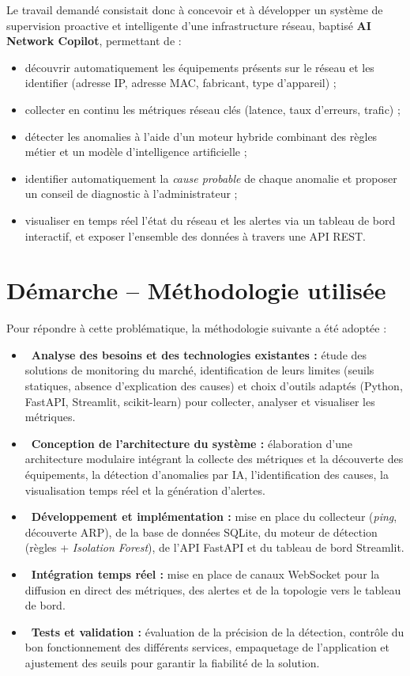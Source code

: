 \documentclass[12pt,a4paper]{report}
\newcommand{\diamonditem}{\ding{117}}   %
\begin{document}
Le travail demandé consistait donc à concevoir et à développer un système de
supervision proactive et intelligente d'une infrastructure réseau, baptisé
\textbf{AI Network Copilot}, permettant de :
\begin{itemize}[leftmargin=*]
\item découvrir automatiquement les équipements présents sur le réseau et les
identifier (adresse IP, adresse MAC, fabricant, type d'appareil) ;
\item collecter en continu les métriques réseau clés (latence, taux d'erreurs,
trafic) ;
\item détecter les anomalies à l'aide d'un moteur hybride combinant des règles
métier et un modèle d'intelligence artificielle ;
\item identifier automatiquement la \emph{cause probable} de chaque anomalie et
proposer un conseil de diagnostic à l'administrateur ;
\item visualiser en temps réel l'état du réseau et les alertes via un tableau de
bord interactif, et exposer l'ensemble des données à travers une API REST.
\end{itemize}

\section{Démarche -- Méthodologie utilisée}
Pour répondre à cette problématique, la méthodologie suivante a été adoptée :
\begin{itemize}[leftmargin=*]
\item \textbf{\diamonditem\ Analyse des besoins et des technologies existantes :}
étude des solutions de monitoring du marché, identification de leurs limites
(seuils statiques, absence d'explication des causes) et choix d'outils adaptés
(Python, FastAPI, Streamlit, scikit-learn) pour collecter, analyser et visualiser
les métriques.
\item \textbf{\diamonditem\ Conception de l'architecture du système :}
élaboration d'une architecture modulaire intégrant la collecte des métriques et la
découverte des équipements, la détection d'anomalies par IA, l'identification des
causes, la visualisation temps réel et la génération d'alertes.
\item \textbf{\diamonditem\ Développement et implémentation :} mise en place du
collecteur (\textit{ping}, découverte ARP), de la base de données SQLite, du
moteur de détection (règles + \textit{Isolation Forest}), de l'API FastAPI et du
tableau de bord Streamlit.
\item \textbf{\diamonditem\ Intégration temps réel :} mise en place de canaux
WebSocket pour la diffusion en direct des métriques, des alertes et de la
topologie vers le tableau de bord.
\item \textbf{\diamonditem\ Tests et validation :} évaluation de la précision de la
détection, contrôle du bon fonctionnement des différents services, empaquetage de
l'application et ajustement des seuils pour garantir la fiabilité de la solution.
\end{itemize}
\end{document}
